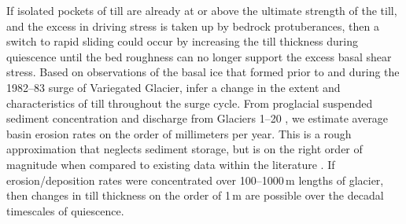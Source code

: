 \documentclass[draft,linenumbers]{agujournal}
\begin{document}




If isolated pockets of till are already at or above the ultimate strength of the till, and the excess in driving stress is taken up by bedrock protuberances, then a switch to rapid sliding could occur by increasing the till thickness during quiescence until the bed roughness can no longer support the excess basal shear stress. 
Based on observations of the basal ice that formed prior to and during the 1982--83 surge of Variegated Glacier, \cite{Sharp1994} infer a change in the extent and characteristics of till throughout the surge cycle. From proglacial suspended sediment concentration and discharge from Glaciers 1--20 \citep{Crompton2016}, we estimate average basin erosion rates on the order of millimeters per year. This is a rough approximation that neglects sediment storage, but is on the right order of magnitude when compared to existing data within the literature \citep[e.g.][]{Hallet1996a}. If erosion/deposition rates were concentrated over 100--1000\,m lengths of glacier, then changes in till thickness on the order of 1\,m are possible over the decadal timescales of quiescence.  
\end{document}
